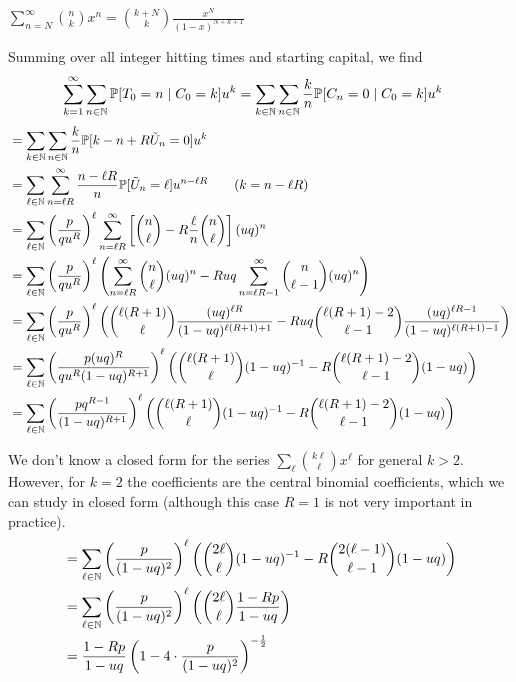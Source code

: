 \begin{lemma}

  $\sum_{n=N}^\infty { n\choose k } x^n = {k+N \choose k} \frac{x^N}{(1-x)^{N+k+1}}$

\end{lemma}

Summing over all integer hitting times and starting capital, we find
\begin{align*}
  \sum_{k=1}^\infty\sum_{n\in\mathbb{N}} \mathbb{P}[T_0 = n\mid C_0=k]u^k &= \sum_{k\in\mathbb{N}}\sum_{n\in\mathbb{N}} \frac{k}{n} \mathbb{P}[C_n = 0\mid C_0=k]u^k 
\end{align*}
\begin{align*}
  &= \sum_{k\in\mathbb{N}}\sum_{n\in\mathbb{N}} \frac{k}{n} \mathbb{P}[k - n + R\tilde{U}_n = 0]u^k \\
  &= \sum_{\ell\in\mathbb{N}}\sum_{n=\ell R}^\infty \frac{n-\ell R}{n} \mathbb{P}[\tilde{U}_n = \ell]u^{n-\ell R}   \qquad (k=n-\ell R)\\
  &= \sum_{\ell\in\mathbb{N}} \left( \frac{p}{qu^R} \right)^\ell \sum_{n=\ell R}^\infty \left[ 
    {n\choose \ell} - R \frac{\ell}{n} {n\choose \ell} 
  \right](uq)^n \\
  &= \sum_{\ell\in\mathbb{N}} \left( \frac{p}{qu^R} \right)^\ell 
  \left( 
    \sum_{n=\ell R}^\infty {n\choose \ell} (uq)^n - 
    Ruq \sum_{n=\ell R - 1}^\infty {n\choose \ell-1} (uq)^n
  \right) \\
  &= \sum_{\ell\in\mathbb{N}} \left( 
    \frac{p}{qu^R} 
  \right)^\ell 
  \left(
    {\ell(R+1) \choose \ell} \frac{ (uq)^{\ell R} } {(1-uq)^{\ell(R+1)+1} } - 
    Ruq {\ell(R+1)-2 \choose \ell - 1} \frac { (uq)^{\ell R-1} } { (1-uq)^{\ell(R+1) -1} }
  \right) \\
  &= \sum_{\ell\in\mathbb{N}} \left( 
    \frac{p(uq)^R}{qu^R(1-uq)^{R+1}} 
  \right)^\ell 
  \left(
    {\ell(R+1) \choose \ell} (1-uq)^{-1} - 
    R {\ell(R+1)-2 \choose \ell - 1} (1-uq)
  \right)  \\
  &= \sum_{\ell\in\mathbb{N}} \left( 
    \frac{pq^{R-1}}{(1-uq)^{R+1}} 
  \right)^\ell 
  \left(
    {\ell(R+1) \choose \ell} (1-uq)^{-1} - 
    R {\ell(R+1)-2 \choose \ell - 1} (1-uq)
  \right)
\end{align*}

We don't know a closed form for the series $\sum_\ell { k\ell \choose \ell }x^\ell $ for general $k>2$.
%
However, for $k=2$ the coefficients are the central binomial coefficients, which we can study in closed form (although this case $R=1$ is not very important in practice).
%
\begin{align*}
  &= \sum_{\ell\in\mathbb{N}} \left( 
    \frac{p}{(1-uq)^{2}} 
  \right)^\ell 
  \left(
    {2\ell \choose \ell} (1-uq)^{-1} - 
    R {2(\ell-1) \choose \ell - 1} (1-uq)
  \right) \\
  &= \sum_{\ell\in\mathbb{N}} \left( 
    \frac{p}{(1-uq)^{2}} 
  \right)^\ell 
  \left(
    {2\ell \choose \ell} \frac{1-Rp}{1-uq}
  \right) \\
  &= \frac{1-Rp}{1-uq}\left(
    1 - 4\cdot \frac{p}{(1-uq)^{2}}
  \right)^{-\frac{1}{2}} 
\end{align*}

